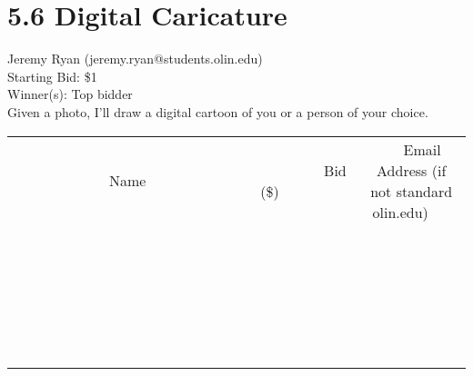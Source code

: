 \documentclass[11pt]{article}
\begin{document}
					\section*{5.6 Digital Caricature}
					Jeremy Ryan (jeremy.ryan@students.olin.edu) \\
					Starting Bid: \$1 \\
					Winner(s): Top bidder \\
					Given a photo, I'll draw a digital cartoon of you or a person of your choice. \\
					[6ex]
					\begin{tabular}{c c c}
						~~~~~~~~~~~~~Name~~~~~~~~~~~~~ & ~~~~~~~~~Bid (\$)~~~~~~~~~ & ~~~Email Address (if not standard olin.edu)~~~ \\
				
 & & \\
\hline
 & & \\
\hline
 & & \\
\hline
 & & \\
\hline
 & & \\
\hline
 & & \\
\hline
 & & \\
\hline
 & & \\
\hline
 & & \\
\hline
 & & \\
\hline
 & & \\
\hline
 & & \\
\hline
 & & \\
\hline
 & & \\
\hline
 & & \\
\hline
 & & \\
\hline
 & & \\
\hline
 & & \\
\hline
 & & \\
\hline
 & & \\
\hline
 & & \\
\hline
 & & \\
\hline
 & & \\
\hline
 & & \\
\hline
 & & \\
\hline
 & & \\
\hline
					\end{tabular}
					\clearpage
				
\end{document}
